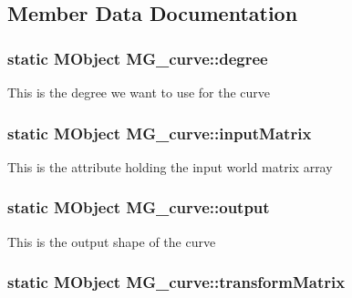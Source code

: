 \subsection{Member Data Documentation}
\hypertarget{class_m_g__curve_a3330e534c2b2d2b7db3c621af0c4d6b2}{
\subsubsection[{degree}]{\setlength{\rightskip}{0pt plus 5cm}static M\-Object M\-G\-\_\-curve\-::degree\hspace{0.3cm}{\ttfamily [static]}}}\label{class_m_g__curve_a3330e534c2b2d2b7db3c621af0c4d6b2}
This is the degree we want to use for the curve \hypertarget{class_m_g__curve_a81892d761eb59f6ae72dc5455e37de26}{
\subsubsection[{input\-Matrix}]{\setlength{\rightskip}{0pt plus 5cm}static M\-Object M\-G\-\_\-curve\-::input\-Matrix\hspace{0.3cm}{\ttfamily [static]}}}\label{class_m_g__curve_a81892d761eb59f6ae72dc5455e37de26}
This is the attribute holding the input world matrix array \hypertarget{class_m_g__curve_a2e9dc1c2f81ae96e443d7ce8db7ff668}{
\subsubsection[{output}]{\setlength{\rightskip}{0pt plus 5cm}static M\-Object M\-G\-\_\-curve\-::output\hspace{0.3cm}{\ttfamily [static]}}}\label{class_m_g__curve_a2e9dc1c2f81ae96e443d7ce8db7ff668}
This is the output shape of the curve \hypertarget{class_m_g__curve_a03d8b8f59871792f08bc09ad64447354}{
\subsubsection[{transform\-Matrix}]{\setlength{\rightskip}{0pt plus 5cm}static M\-Object M\-G\-\_\-curve\-::transform\-Matrix\hspace{0.3cm}{\ttfamily [static]}}}\label{class_m_g__curve_a03d8b8f59871792f08bc09ad64447354}
